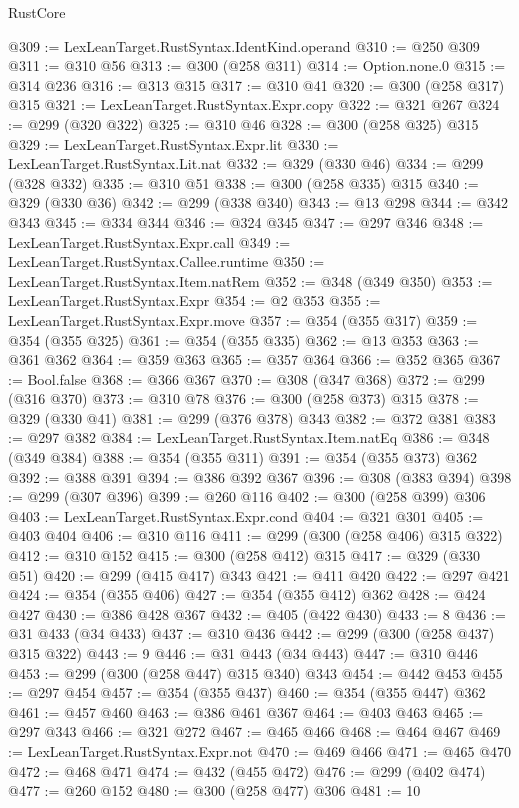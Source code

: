 \begin{lexlean}{RustCore}
\begin{coremodule}
@309 := LexLeanTarget.RustSyntax.IdentKind.operand
@310 := @250 @309
@311 := @310 @56
@313 := @300 (@258 @311)
@314 := Option.none.{0}
@315 := @314 @236
@316 := @313 @315
@317 := @310 @41
@320 := @300 (@258 @317) @315
@321 := LexLeanTarget.RustSyntax.Expr.copy
@322 := @321 @267
@324 := @299 (@320 @322)
@325 := @310 @46
@328 := @300 (@258 @325) @315
@329 := LexLeanTarget.RustSyntax.Expr.lit
@330 := LexLeanTarget.RustSyntax.Lit.nat
@332 := @329 (@330 @46)
@334 := @299 (@328 @332)
@335 := @310 @51
@338 := @300 (@258 @335) @315
@340 := @329 (@330 @36)
@342 := @299 (@338 @340)
@343 := @13 @298
@344 := @342 @343
@345 := @334 @344
@346 := @324 @345
@347 := @297 @346
@348 := LexLeanTarget.RustSyntax.Expr.call
@349 := LexLeanTarget.RustSyntax.Callee.runtime
@350 := LexLeanTarget.RustSyntax.Item.natRem
@352 := @348 (@349 @350)
@353 := LexLeanTarget.RustSyntax.Expr
@354 := @2 @353
@355 := LexLeanTarget.RustSyntax.Expr.move
@357 := @354 (@355 @317)
@359 := @354 (@355 @325)
@361 := @354 (@355 @335)
@362 := @13 @353
@363 := @361 @362
@364 := @359 @363
@365 := @357 @364
@366 := @352 @365
@367 := Bool.false
@368 := @366 @367
@370 := @308 (@347 @368)
@372 := @299 (@316 @370)
@373 := @310 @78
@376 := @300 (@258 @373) @315
@378 := @329 (@330 @41)
@381 := @299 (@376 @378) @343
@382 := @372 @381
@383 := @297 @382
@384 := LexLeanTarget.RustSyntax.Item.natEq
@386 := @348 (@349 @384)
@388 := @354 (@355 @311)
@391 := @354 (@355 @373) @362
@392 := @388 @391
@394 := @386 @392 @367
@396 := @308 (@383 @394)
@398 := @299 (@307 @396)
@399 := @260 @116
@402 := @300 (@258 @399) @306
@403 := LexLeanTarget.RustSyntax.Expr.cond
@404 := @321 @301
@405 := @403 @404
@406 := @310 @116
@411 := @299 (@300 (@258 @406) @315 @322)
@412 := @310 @152
@415 := @300 (@258 @412) @315
@417 := @329 (@330 @51)
@420 := @299 (@415 @417) @343
@421 := @411 @420
@422 := @297 @421
@424 := @354 (@355 @406)
@427 := @354 (@355 @412) @362
@428 := @424 @427
@430 := @386 @428 @367
@432 := @405 (@422 @430)
@433 := 8
@436 := @31 @433 (@34 @433)
@437 := @310 @436
@442 := @299 (@300 (@258 @437) @315 @322)
@443 := 9
@446 := @31 @443 (@34 @443)
@447 := @310 @446
@453 := @299 (@300 (@258 @447) @315 @340) @343
@454 := @442 @453
@455 := @297 @454
@457 := @354 (@355 @437)
@460 := @354 (@355 @447) @362
@461 := @457 @460
@463 := @386 @461 @367
@464 := @403 @463
@465 := @297 @343
@466 := @321 @272
@467 := @465 @466
@468 := @464 @467
@469 := LexLeanTarget.RustSyntax.Expr.not
@470 := @469 @466
@471 := @465 @470
@472 := @468 @471
@474 := @432 (@455 @472)
@476 := @299 (@402 @474)
@477 := @260 @152
@480 := @300 (@258 @477) @306
@481 := 10

\end{coremodule}
\end{lexlean}
